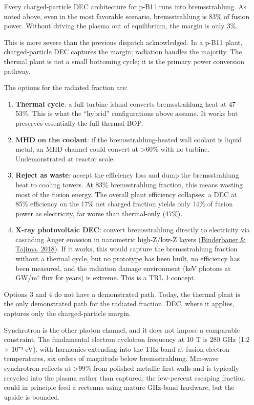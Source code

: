 \documentclass{article}
\begin{document}
Every charged-particle DEC architecture for p-B11 runs into
bremsstrahlung. As noted above, even in the most favorable scenario,
bremsstrahlung is 83\% of fusion power. Without driving the plasma out
of equilibrium, the margin is only 3\%.

This is more severe than the previous dispatch acknowledged. In a p-B11
plant, charged-particle DEC captures the margin; radiation handles the
majority. The thermal plant is not a small bottoming cycle; it is the
primary power conversion pathway.

The options for the radiated fraction are:

\begin{enumerate}
\item \textbf{Thermal cycle}: a full turbine island converts bremsstrahlung
  heat at 47--53\%. This is what the ``hybrid'' configurations above
  assume. It works but preserves essentially the full thermal BOP.
\item \textbf{MHD on the coolant}: if the bremsstrahlung-heated wall coolant
  is liquid metal, an MHD channel could convert at \textgreater60\% with
  no turbine. Undemonstrated at reactor scale.
\item \textbf{Reject as waste}: accept the efficiency loss and dump the
  bremsstrahlung heat to cooling towers. At 83\% bremsstrahlung
  fraction, this means wasting most of the fusion energy. The overall
  plant efficiency collapses: a DEC at 85\% efficiency on the 17\% net
  charged fraction yields only 14\% of fusion power as electricity, far
  worse than thermal-only (47\%).
\item \textbf{X-ray photovoltaic DEC}: convert bremsstrahlung directly to
  electricity via cascading Auger emission in nanometric high-Z/low-Z
  layers
  (\href{https://patents.google.com/patent/US9893226B2/}{Binderbauer \&
  Tajima, 2018}). If it works, this would capture the bremsstrahlung
  fraction without a thermal cycle, but no prototype has been built, no
  efficiency has been measured, and the radiation damage environment
  (keV photons at GW/m² flux for years) is extreme. This is a TRL 1
  concept.
\end{enumerate}

Options 3 and 4 do not have a demonstrated path. Today, the thermal
plant is the only demonstrated path for the radiated fraction. DEC,
where it applies, captures only the charged-particle margin.

Synchrotron is the other photon channel, and it does not impose a
comparable constraint. The fundamental electron cyclotron frequency at
10 T is 280 GHz (1.2 × 10⁻³ eV), with harmonics extending into the THz
band at fusion electron temperatures, six orders of magnitude below
bremsstrahlung. Mm-wave synchrotron reflects at \textgreater99\% from
polished metallic first walls and is typically recycled into the plasma
rather than captured; the few-percent escaping fraction could in
principle feed a rectenna using mature GHz-band hardware, but the upside
is bounded.
\end{document}
